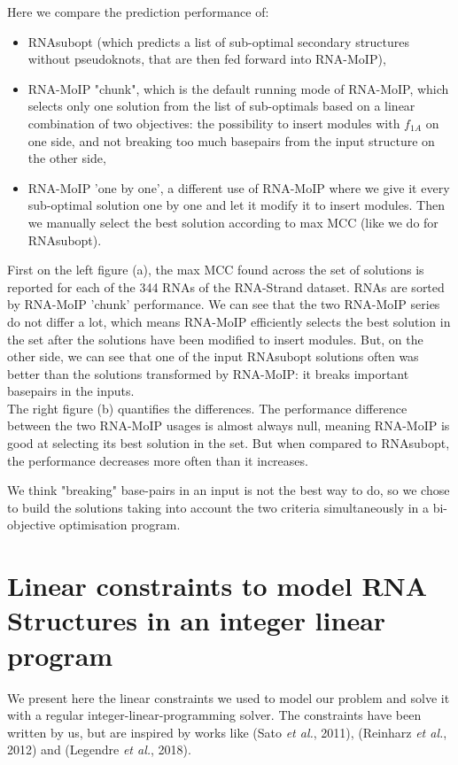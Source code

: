 \documentclass{article}
\begin{document}
Here we compare the prediction performance of:
\begin{itemize}
    \item RNAsubopt (which predicts a list of sub-optimal secondary structures without pseudoknots, that are then fed forward into RNA-MoIP), 
    \item RNA-MoIP "chunk", which is the default running mode of RNA-MoIP, which selects only one solution from the list of sub-optimals based on a linear combination of two objectives: the possibility to insert modules with $f_{1A}$ on one side, and not breaking too much basepairs from the input structure on the other side,
    \item RNA-MoIP 'one by one', a different use of RNA-MoIP where we give it every sub-optimal solution one by one and let it modify it to insert modules. Then we manually select the best solution according to max MCC (like we do for RNAsubopt).
\end{itemize}

First on the left figure (a), the max MCC found across the set of solutions is reported for each of the 344 RNAs of the RNA-Strand dataset. RNAs are sorted by RNA-MoIP 'chunk' performance. We can see that the two RNA-MoIP series do not differ a lot, which means RNA-MoIP efficiently selects the best solution in the set after the solutions have been modified to insert modules. But, on the other side, we can see that one of the input RNAsubopt solutions often was better than the solutions transformed by RNA-MoIP: it breaks important basepairs in the inputs.\\
The right figure (b) quantifies the differences. The performance difference between the two RNA-MoIP usages is almost always null, meaning RNA-MoIP is good at selecting its best solution in the set. But when compared to RNAsubopt, the performance decreases more often than it increases.

We think "breaking" base-pairs in an input is not the best way to do, so we chose to build the solutions taking into account the two criteria simultaneously in a bi-objective optimisation program. 

\newpage

\section{Linear constraints to model RNA Structures in an integer linear program}
We present here the linear constraints we used to model our problem and solve it with a regular integer-linear-programming solver. The constraints have been written by us, but are inspired by works like (Sato \textit{et al.}, 2011), (Reinharz \textit{et al.}, 2012) and (Legendre \textit{et al.}, 2018).
\end{document}
